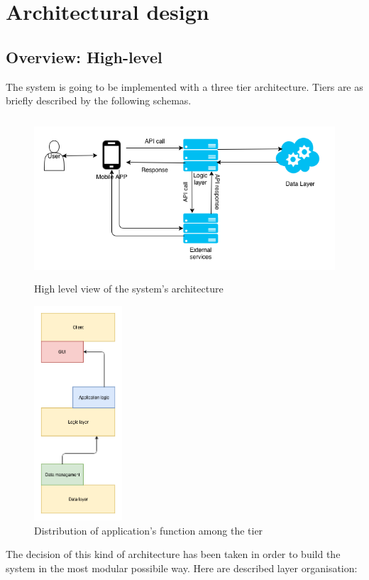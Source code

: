 \documentclass[DD.tex]{subfiles}
\begin{document}
\section{Architectural design}
\subsection{Overview: High-level}

The system is going to be implemented with a three tier architecture. Tiers are  as briefly described by the following schemas.

\begin{figure}[h!]
	\centering
	\includegraphics[height=6.00cm,keepaspectratio]{Figures/GeneralSchema}
	\caption{High level view of the system's architecture}
\end{figure}

\begin{figure}[h!]
	\centering
	\includegraphics[height=8.00cm,keepaspectratio]{Figures/ThreeTierSchema}
	\caption{Distribution of application's function among the tier}
\end{figure}

The decision of this kind of architecture has been taken in order to build the system in the most modular possibile way. Here are described layer organisation:
\end{document}
